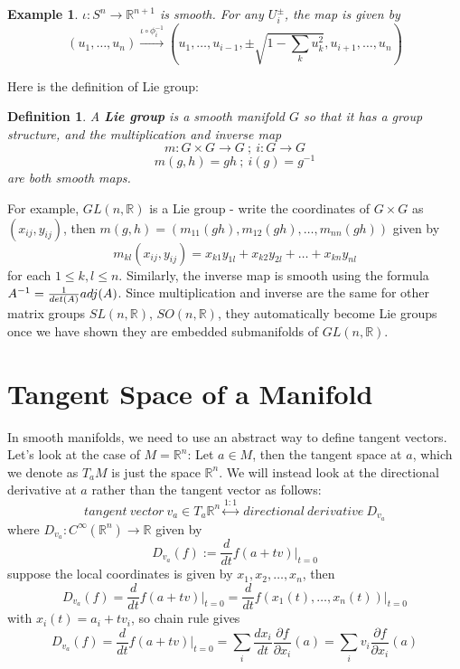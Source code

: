 \documentclass[11pt]{book}
\newtheorem{example}[theorem]{Example}
\newtheorem{definition}[theorem]{Definition}
\newcommand{\bb}[1]{\mathbb{#1}}
\begin{document}
\begin{example}
$\iota: S^n \to \bb{R}^{n+1}$ is smooth. For any $U_i^{\pm}$, the map is given by
$$(u_1, \dots, u_n) \stackrel{\iota \circ \phi_i^{-1}}{\longrightarrow} (u_1, \dots, u_{i-1}, \pm\sqrt{1- \sum_k u_k^2}, u_{i+1}, \dots, u_n)$$
\end{example}
Here is the definition of Lie group:
\begin{definition}
A \textbf{Lie group} is a smooth manifold $G$ so that it has a group structure, and the multiplication and inverse map
$$m: G \times G \to G\ ;\ i: G \to G$$
$$m(g,h) = gh\ ;\ i(g) = g^{-1}$$
are both smooth maps.
\end{definition}
For example, $GL(n,\bb{R})$ is a Lie group - write the coordinates of $G \times G$ as $(x_{ij}, y_{ij})$, then $m(g,h) = (m_{11}(gh), m_{12}(gh), \dots, m_{nn}(gh))$ given by
$$m_{kl}(x_{ij}, y_{ij}) = x_{k1}y_{1l} + x_{k2}y_{2l} + \dots + x_{kn}y_{nl}$$
for each $1 \leq k,l \leq n$. Similarly, the inverse map is smooth using the formula $A^{-1} = \frac{1}{\\det(A)}adj(A)$.
Since multiplication and inverse are the same for other matrix groups $SL(n,\bb{R})$, $SO(n,\bb{R})$, they automatically become Lie groups once we have shown they are embedded submanifolds of $GL(n,\bb{R})$.
\section{Tangent Space of a Manifold} In smooth manifolds, we need to use an abstract way to define tangent vectors. Let's look at the case of $M = \bb{R}^n$:
Let $a \in M$, then the tangent space at $a$, which we denote as $T_aM$ is just the space $\bb{R}^n$. We will instead look at the directional derivative at $a$ rather than the tangent vector as follows:
$$tangent\ vector\ v_a \in T_a\bb{R}^n \stackrel{1:1}{\longleftrightarrow}\ directional\ derivative\ D_{v_a}$$
where $D_{v_a}: C^{\infty}(\bb{R}^n) \to \bb{R}$ given by
$$D_{v_a}(f) := \frac{d}{dt}f(a+tv)  \Big|_{t = 0}$$
suppose the local coordinates is given by $x_1, x_2, \dots, x_n$, then
$$D_{v_a}(f) = \frac{d}{dt}f(a+tv)  \Big|_{t = 0} = \frac{d}{dt}f(x_1(t), \dots, x_n(t))  \Big|_{t = 0}$$
with $x_i(t) = a_i + tv_i$, so chain rule gives
$$D_{v_a}(f) = \frac{d}{dt}f(a+tv)  \Big|_{t = 0} = \sum_i \frac{dx_i}{dt}\frac{\partial f}{\partial x_i}(a) = \sum_i v_i\frac{\partial f}{\partial x_i}(a)$$
\end{document}
